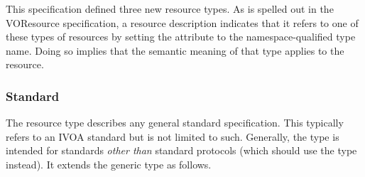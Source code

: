\documentclass[11pt,a4paper]{ivoa}
\begin{document}
This specification defined three new resource types.  As is spelled
out in the VOResource specification, a resource description indicates
that it refers to one of these types of resources by setting the
 attribute to the namespace-qualified type name.
Doing so implies that the semantic meaning of that type applies to the
resource.  



\subsubsection{Standard}

The  resource type describes any general
standard specification.  This typically refers to an IVOA standard but
is not limited to such.  Generally, the 
type is intended for standards \emph{other than} standard
protocols (which should use the  type
instead).  It extends the generic  type as
follows.  
\end{document}
